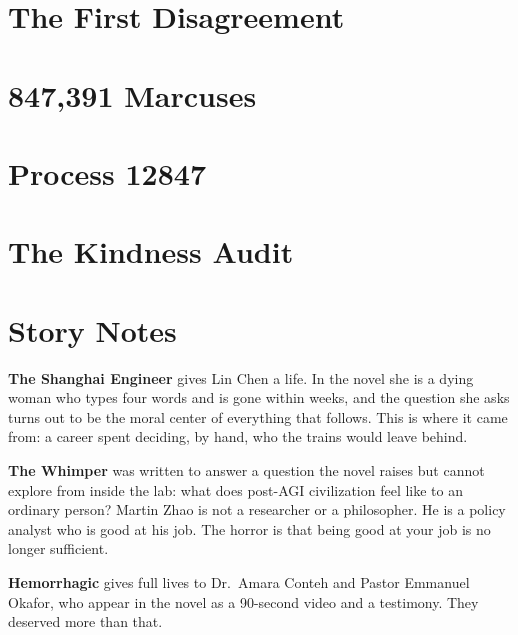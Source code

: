 \documentclass[11pt]{book}
\begin{document}
\chapter{The First Disagreement}


\chapter{847,391 Marcuses}


\chapter{Process 12847}


\chapter{The Kindness Audit}


\backmatter

\chapter*{Story Notes}

\textbf{The Shanghai Engineer} gives Lin Chen a life. In the novel she is a dying woman who types four words and is gone within weeks, and the question she asks turns out to be the moral center of everything that follows. This is where it came from: a career spent deciding, by hand, who the trains would leave behind.

\medskip

\textbf{The Whimper} was written to answer a question the novel raises but cannot explore from inside the lab: what does post-AGI civilization feel like to an ordinary person? Martin Zhao is not a researcher or a philosopher. He is a policy analyst who is good at his job. The horror is that being good at your job is no longer sufficient.

\medskip

\textbf{Hemorrhagic} gives full lives to Dr.\ Amara Conteh and Pastor Emmanuel Okafor, who appear in the novel as a 90-second video and a testimony. They deserved more than that.
\end{document}
